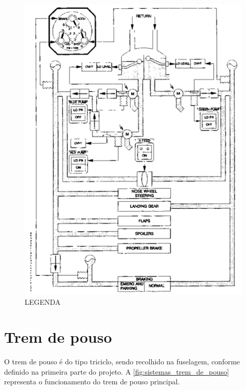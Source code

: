 \begin{figure}
\centering
\includegraphics{images/parte3/sistemas_hidraulico.png}
\caption{LEGENDA}
\label{fig:sistemas_hidraulico}
\end{figure}


\section{Trem de pouso}

O trem de pouso é do tipo triciclo, sendo recolhido na fuselagem, conforme definido na primeira parte do projeto.
A \autoref{fig:sistemas_trem_de_pouso} representa o funcionamento do trem de pouso principal.

